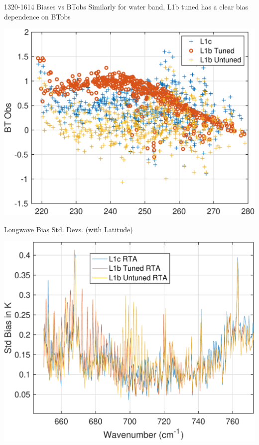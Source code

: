 \documentclass[10pt,t]{beamer}
\begin{document}
\begin{frame}[label={sec:org6447e1f}]{1320-1614 \wn Biases vs BTobs}
Similarly for water band, L1b tuned has a clear bias dependence on BTobs
\begin{center}
\includegraphics[width=0.75\linewidth]{./Talk2/bias_vs_btobs_1320-1614.pdf}
\end{center}
\end{frame}

\begin{frame}[label={sec:org9697316}]{Longwave Bias Std. Devs. (with Latitude)}
\begin{center}
\includegraphics[width=0.75\linewidth]{./Talk2/std_3rta_lw.pdf}
\end{center}
\end{frame}
\end{document}
